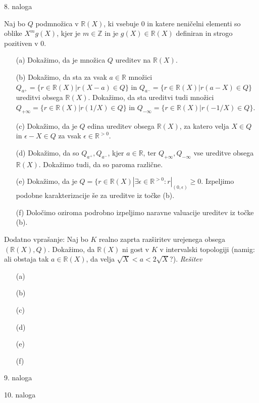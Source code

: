 \documentclass[a4paper, 12pt]{article}
\newcommand{\Z}{\mathbb{Z}}
\newcommand{\R}{\mathbb{R}}
\begin{document}
\begin{flushleft}
8. naloga
\end{flushleft}
Naj bo $Q$ podmnožica v $\R(X)$, ki vsebuje 0 in katere neničelni elementi so oblike $X^m g(X)$, kjer je $m\in \Z$ in je $g(X) \in \R(X)$ definiran in strogo pozitiven v 0.
\begin{enumerate}
\item[(a)] Dokažimo, da je množica $Q$ ureditev na $\R(X)$.
\item[(b)] Dokažimo, da sta za vsak $a\in \R$ množici $Q_{a^+} = \{r\in \R(X)| r(X-a) \in Q\}$ in $Q_{a^-} = \{ r \in \R(X)| r(a-X) \in Q\}$ ureditvi obsega $\R(X)$. Dokažimo, da sta ureditvi tudi množici $Q_{+\infty} = \{r\in \R(X)|r(1/X) \in Q\}$ in $Q_{-\infty} = \{r \in \R(X)| r(-1/X) \in Q\}$. 
\item[(c)] Dokažimo, da je $Q$ edina ureditev obsega $\R(X)$, za katero velja $X\in Q$ in $\epsilon - X \in Q$ za vsak $\epsilon \in \R^{>0}$.
\item[(d)] Dokažimo, da so $Q_{a^+}, Q_{a^-}$, kjer $a\in \R$, ter $Q_{+\infty}, Q_{-\infty}$ vse ureditve obsega $\R(X)$. Dokažimo tudi, da so paroma različne.
\item[(e)] Dokažimo, da je $Q = \{r\in \R(X)| \exists \epsilon \in \R^{>0}: r|_{(0,\epsilon)} \ge 0$. Izpeljimo podobne karakterizacije še za ureditve iz točke (b).
\item[(f)] Določimo oziroma podrobno izpeljimo naravne valuacije ureditev iz točke (b).
\end{enumerate}
Dodatno vprašanje: Naj bo $K$ realno zaprta razširitev urejenega obsega $(\R(X),Q)$. Dokažimo, da $\R(X)$ ni gost v $K$ v intervalski topologiji (namig: ali obstaja tak $a \in \R(X)$, da velja $\sqrt{X} < a < 2\sqrt{X}$?).
\emph{Rešitev}
\begin{enumerate}
\item[(a)]
\item[(b)]
\item[(c)]
\item[(d)]
\item[(e)]
\item[(f)]
\end{enumerate}
\begin{flushleft}
9. naloga
\end{flushleft}

\begin{flushleft}
10. naloga
\end{flushleft}
\end{document}
